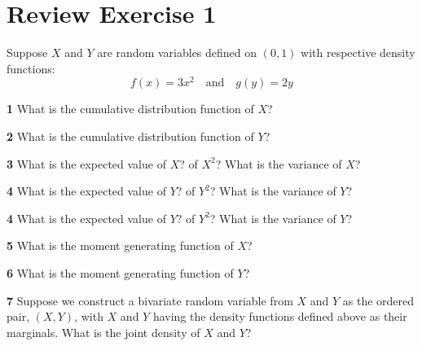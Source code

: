 \documentclass{amsart}
\begin{document}
\section{Review Exercise 1}
Suppose $X$ and $Y$ are random variables defined on $(0,1)$ with respective density functions:
\[
f(x) = 3x^2\quad\mbox{and}\quad g(y) = 2y
\]
\par\vspace{0.4 cm}\noindent
\textbf{1} What is the cumulative distribution function of $X$?
\par\vspace{1.5 cm}\noindent
\textbf{2} What is the cumulative distribution function of $Y$?
\par\vspace{1.5 cm}\noindent
\textbf{3} What is the expected value of $X$?  of $X^2$?  What is the variance of $X$?
\par\vspace{1.5 cm}\noindent
\textbf{4} What is the expected value of $Y$?  of $Y^2$?  What is the variance of $Y$?
\par\vspace{1.5 cm}\noindent
\textbf{4} What is the expected value of $Y$?  of $Y^2$?  What is the variance of $Y$?
\par\vspace{1.5 cm}\noindent
\textbf{5} What is the moment generating function of $X$?
\par\vspace{1.5 cm}\noindent
\textbf{6} What is the moment generating function of $Y$?
\par\vspace{1.5 cm}\noindent
\textbf{7} Suppose we construct a bivariate random variable from $X$ and $Y$ as the ordered pair, $(X,Y)$, with $X$ and $Y$ having the density functions defined above as their marginals.  What is the joint density of $X$ and $Y$?
\end{document}
